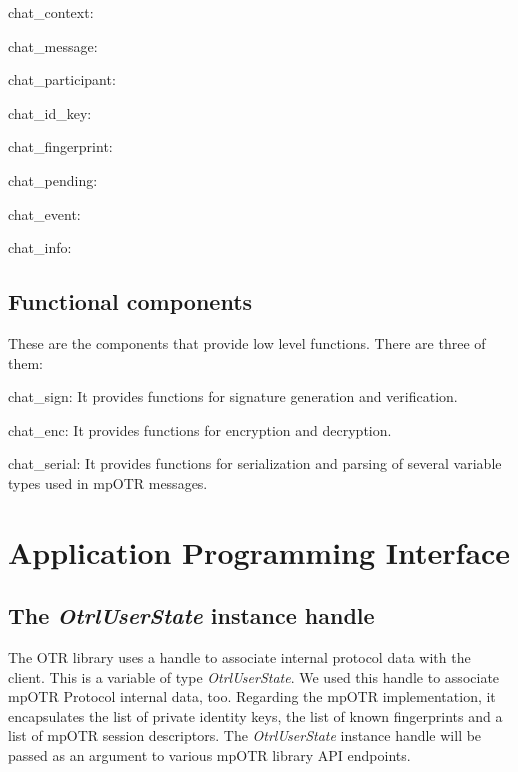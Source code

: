 \begin{description}
  \item chat\_context:

  \item chat\_message:

  \item chat\_participant:
  
  \item chat\_id\_key:

  \item chat\_fingerprint:

  \item chat\_pending:
  
  \item chat\_event:

  \item chat\_info: 
\end{description}

\subsection{Functional components}
These are the components that provide low level functions. There are three of them:

\begin{description}
  \item chat\_sign: It provides functions for signature generation and verification.

  \item chat\_enc: It provides functions for encryption and decryption.

  \item chat\_serial: It provides functions for serialization and parsing of several variable types used in mpOTR messages. 
\end{description}

\section{Application Programming Interface}

\subsection{The \emph{OtrlUserState} instance handle}
The OTR library uses a handle to associate internal protocol data with the client. This is a variable of type \emph{OtrlUserState}. We used this handle to associate mpOTR Protocol internal data, too. Regarding the mpOTR implementation, it encapsulates the list of private identity keys, the list of known fingerprints and a list of mpOTR session descriptors. The \emph{OtrlUserState} instance handle will be passed as an argument to various mpOTR library API endpoints.


